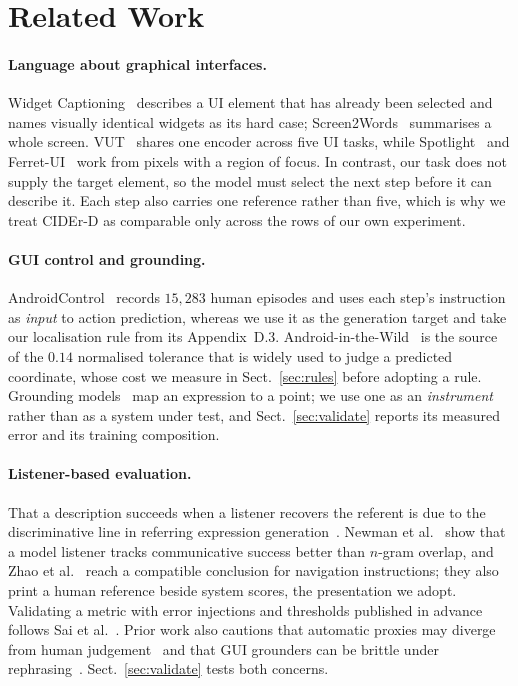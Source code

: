 \documentclass[runningheads,a4paper]{llncs}
\begin{document}
\section{Related Work}
\label{sec:related}

\paragraph{Language about graphical interfaces.}
Widget Captioning~\cite{widgetcap} describes a UI element that has already been selected
and names visually identical widgets as its hard case; Screen2Words~\cite{screen2words} summarises
a whole screen. VUT~\cite{vut}
shares one encoder across five UI tasks, while Spotlight~\cite{spotlight} and
Ferret-UI~\cite{ferretui} work from pixels with a region of focus. In contrast, our task does not
supply the target element, so the model must select the next
step before it can describe it. Each
step also carries one reference rather than five, which is why we treat CIDEr-D as comparable
only across the rows of our own experiment.

\paragraph{GUI control and grounding.}
AndroidControl~\cite{androidcontrol} records $15{,}283$ human episodes and uses each step's
instruction as \emph{input} to action prediction, whereas we use it as the generation target and
take our localisation rule from its Appendix~D.3. Android-in-the-Wild~\cite{aitw} is the source
of the $0.14$ normalised tolerance that is widely used to judge a predicted coordinate, whose
cost we measure in Sect.~\ref{sec:rules} before adopting a rule. Grounding
models~\cite{seeclick,osatlas,uground} map an expression to a point; we use one as an
\emph{instrument} rather than as a system under test, and Sect.~\ref{sec:validate} reports its
measured error and its training composition.

\paragraph{Listener-based evaluation.}
That a description succeeds when a listener recovers the referent is due to the discriminative
line in referring expression generation~\cite{mao2016,luo2017,yu2016}. Newman et
al.~\cite{newman2020} show that a model listener tracks communicative success
better than $n$-gram overlap, and Zhao et al.~\cite{zhao2021} reach a compatible conclusion for
navigation instructions; they also print a human reference beside system scores, the presentation
we adopt. Validating a metric with error injections and thresholds published in advance follows
Sai et al.~\cite{sai2021}. Prior work also cautions that automatic proxies may diverge from human
judgement~\cite{clark2021} and that GUI grounders can be brittle under
rephrasing~\cite{groundersunderstand}. Sect.~\ref{sec:validate} tests both concerns.
\end{document}
